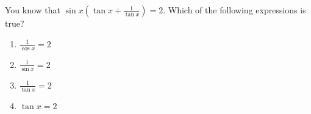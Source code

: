 \documentclass{article}
\begin{document}
\section{}

You know that $\displaystyle \sin x \left( \tan x + \frac{1}{\tan x} \right) = 2$. Which of the following expressions is true?
\begin{enumerate}
\item $\displaystyle\frac{1}{\cos x} = 2$
\item $\displaystyle\frac{1}{\sin x} = 2$
\item $\displaystyle\frac{1}{\tan x} = 2$
\item $\displaystyle\tan x  = 2$
\end{enumerate}
\end{document}

